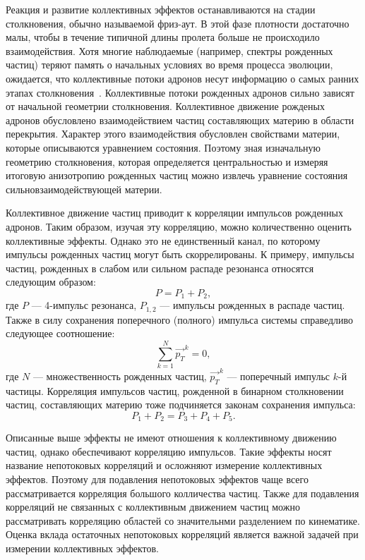Реакция и развитие коллективных эффектов останавливаются на стадии столкновения, обычно называемой фриз-аут. 
В этой фазе плотности достаточно малы, чтобы в течение типичной длины пролета больше не происходило взаимодействия.
Хотя многие наблюдаемые (например, спектры рожденных частиц) теряют память о начальных условиях во время процесса эволюции, ожидается, что коллективные потоки адронов несут информацию о самых ранних этапах столкновения~\cite{Herrmann:1999wu}.
Коллективные потоки рожденных адронов сильно зависят от начальной геометрии столкновения.
Коллективное движение рожденых адронов обусловлено взаимодействием частиц составляющих материю в области перекрытия.
Характер этого взаимодействия обусловлен свойствами материи, которые описываются уравнением состояния.
Поэтому зная изначальную геометрию столкновения, которая определяется центральностью и измеряя итоговую анизотропию рожденных частиц можно извлечь уравнение состояния сильновзаимодействующей материи.

Коллективное движение частиц приводит к корреляции импульсов рожденных адронов.
Таким образом, изучая эту корреляцию, можно количественно оценить коллективные эффекты.
Однако это не единственный канал, по которому импульсы рожденных частиц могут быть скоррелированы.
К примеру, импульсы частиц, рожденных в слабом или сильном распаде резонанса относятся следующим образом:
%
\begin{equation}
    P = P_1 + P_2,
\end{equation}
где $P$ --- 4-импульс резонанса, $P_{1,2}$ --- импульсы рожденных в распаде частиц.
Также в силу сохранения поперечного (полного) импульса системы справедливо следующее соотношение:
%
\begin{equation}
    \sum_{k=1}^{N} \vec{p_T}^k = 0,
\end{equation}
где $N$ --- множественность рожденных частиц, $\vec{p_{T}}^k$ --- поперечный импульс $k$-й частицы.
Корреляция импульсов частиц, рожденной в бинарном столкновении частиц, составляющих материю тоже подчиняется законам сохранения импульса:
%
\begin{equation}
    P_1 + P_2 = P_3 + P_4 + P_5.
\end{equation}

Описанные выше эффекты не имеют отношения к коллективному движению частиц, однако обеспечивают корреляцию импульсов.
Такие эффекты носят название непотоковых корреляций и осложняют измерение коллективных эффектов.
Поэтому для подавления непотоковых эффектов чаще всего рассматривается корреляция большого колличества частиц.
Также для подавления корреляций не связанных с коллективным движением частиц можно рассматривать корреляцию областей со значительнми разделением по кинематике.
Оценка вклада остаточных непотоковых корреляций является важной задачей при измерении коллективных эффектов.


